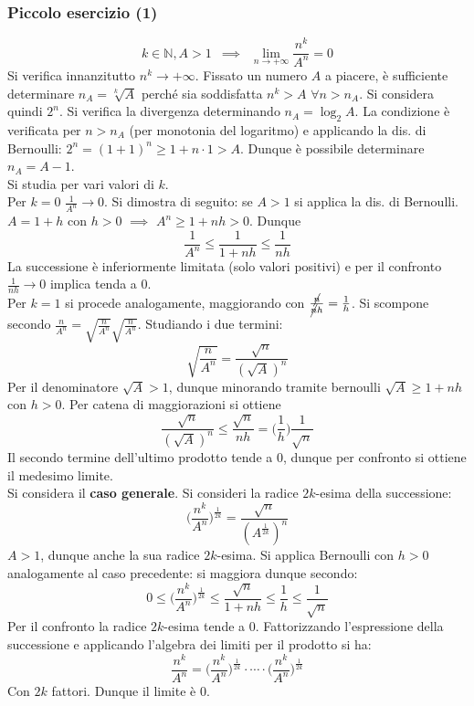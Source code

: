\documentclass[10pt, oneside]{book}
\theoremstyle{plain}
\begin{document}
\subsubsection*{Piccolo esercizio (1)}
\[k \in \mathbb{N}, A > 1 \enspace \implies \enspace \lim \limits_{n \rightarrow + \infty} \frac{n^k}{A^n} = 0\]
Si verifica innanzitutto $n^k \rightarrow +\infty$. Fissato un numero $A$ a piacere, è sufficiente determinare $n_A = \sqrt[k]{A}$ perché sia soddisfatta $n^k > A$ $\forall n > n_A$. Si considera quindi $2^n$. Si verifica la divergenza determinando $n_A = \log_2A$. La condizione è verificata per $n > n_A$ (per monotonia del logaritmo) e applicando la dis. di Bernoulli: $2^n = (1+1)^n \geq 1 + n\cdot 1 > A$. Dunque è possibile determinare $n_A = A -1$.
\\Si studia per vari valori di $k$.
\\Per $k=0$ $\frac{1}{A^n} \rightarrow 0$. Si dimostra di seguito: se $A>1$ si applica la dis. di Bernoulli. $A = 1+h$ con $h>0$ $\implies$ $A^n \geq 1 + nh > 0$. Dunque
\[\frac{1}{A^n} \leq \frac{1}{1+nh} \leq \frac{1}{nh}\]
La successione è inferiormente limitata (solo valori positivi) e per il confronto $\frac{1}{nh} \rightarrow 0$ implica tenda a 0.
\\Per $k=1$ si procede analogamente, maggiorando con $\frac{\cancel{n}}{\cancel{n}h} = \frac{1}{h}$. Si scompone secondo $\frac{n}{A^n} = \sqrt{\frac{n}{A^n}}\sqrt{\frac{n}{A^n}}$. Studiando i due termini:
\[\sqrt{\frac{n}{A^n}} = \frac{\sqrt{n}}{(\sqrt{A})^n}\]
Per il denominatore $\sqrt{A} > 1$, dunque minorando tramite bernoulli $\sqrt{A} \geq 1 + nh$ con $h>0$. Per catena di maggiorazioni si ottiene
\[\frac{\sqrt{n}}{(\sqrt{A})^n} \leq \frac{\sqrt{n}}{nh} = \bigg(\frac{1}{h}\bigg) \frac{1}{\sqrt{n}}\]
Il secondo termine dell'ultimo prodotto tende a 0, dunque per confronto si ottiene il medesimo limite.
\\Si considera il \textbf{caso generale}. Si consideri la radice $2k$-esima della successione: 
\[\bigg(\frac{n^k}{A^n}\bigg)^{\frac{1}{2k}} = \frac{\sqrt{n}}{(A^{\frac{1}{2k}})^n}\]
$A > 1$, dunque anche la sua radice $2k$-esima. Si applica Bernoulli con $h >0$ analogamente al caso precedente: si maggiora dunque secondo:
\[0 \leq \bigg(\frac{n^k}{A^n}\bigg)^{\frac{1}{2k}} \leq \frac{\sqrt{n}}{1 + nh} \leq \frac{1}{h} \leq \frac{1}{\sqrt{n}}\]
Per il confronto la radice $2k$-esima tende a 0. Fattorizzando l'espressione della successione e applicando l'algebra dei limiti per il prodotto si ha:
\[\frac{n^k}{A^n} = \bigg(\frac{n^k}{A^n}\bigg)^{\frac{1}{2k}} \cdot \cdots \cdot \bigg(\frac{n^k}{A^n}\bigg)^{\frac{1}{2k}}\]
Con $2k$ fattori. Dunque il limite è 0.
\end{document}
